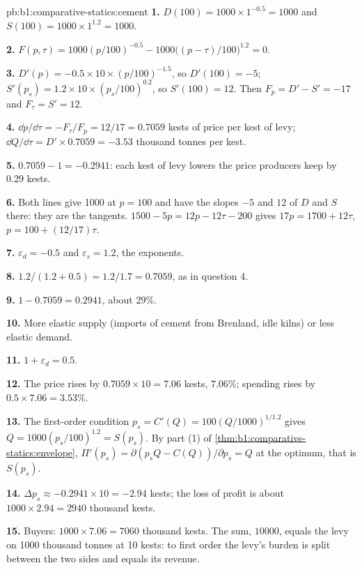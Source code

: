 \begin{solution}{pb:b1:comparative-statics:cement}
\textbf{1.} $D(100) = 1000 \times 1^{-0.5} = 1000$ and $S(100) = 1000 \times 1^{1.2} = 1000$.

\textbf{2.} $F(p, \tau) = 1000(p/100)^{-0.5} - 1000\bigl((p - \tau)/100\bigr)^{1.2} = 0$.

\textbf{3.} $D'(p) = -0.5 \times 10 \times (p/100)^{-1.5}$, so $D'(100) = -5$;
$S'(p_s) = 1.2 \times 10 \times (p_s/100)^{0.2}$, so $S'(100) = 12$. Then
$F_p = D' - S' = -17$ and $F_\tau = S' = 12$.

\textbf{4.} $\dd p/\dd\tau = -F_\tau/F_p = 12/17 = 0.7059$ kests of price per
kest of levy; $\dd Q/\dd\tau = D' \times 0.7059 = -3.53$ thousand tonnes per
kest.

\textbf{5.} $0.7059 - 1 = -0.2941$: each kest of levy lowers the price
producers keep by 0.29 kests.

\textbf{6.} Both lines give 1000 at $p = 100$ and have the slopes $-5$ and
$12$ of $D$ and $S$ there: they are the tangents. $1500 - 5p = 12p - 12\tau -
200$ gives $17p = 1700 + 12\tau$, $p = 100 + (12/17)\tau$.

\textbf{7.} $\varepsilon_d = -0.5$ and $\varepsilon_s = 1.2$, the exponents.

\textbf{8.} $1.2/(1.2 + 0.5) = 1.2/1.7 = 0.7059$, as in question 4.

\textbf{9.} $1 - 0.7059 = 0.2941$, about $29\%$.

\textbf{10.} More elastic supply (imports of cement from Brenland, idle
kilns) or less elastic demand.

\textbf{11.} $1 + \varepsilon_d = 0.5$.

\textbf{12.} The price rises by $0.7059 \times 10 = 7.06$ kests, $7.06\%$; spending
rises by $0.5 \times 7.06 = 3.53\%$.

\textbf{13.} The first-order condition $p_s = C'(Q) = 100(Q/1000)^{1/1.2}$ gives
$Q = 1000(p_s/100)^{1.2} = S(p_s)$. By part (1) of
\cref{thm:b1:comparative-statics:envelope}, $\Pi'(p_s) = \partial(p_sQ - C(Q))/\partial p_s = Q$
at the optimum, that is $S(p_s)$.

\textbf{14.} $\Delta p_s \approx -0.2941 \times 10 = -2.94$ kests; the loss of profit
is about $1000 \times 2.94 = 2940$ thousand kests.

\textbf{15.} Buyers: $1000 \times 7.06 = 7060$ thousand kests. The sum,
$10000$, equals the levy on 1000 thousand tonnes at 10 kests: to first
order the levy's burden is split between the two sides and equals its
revenue.


\end{solution}
